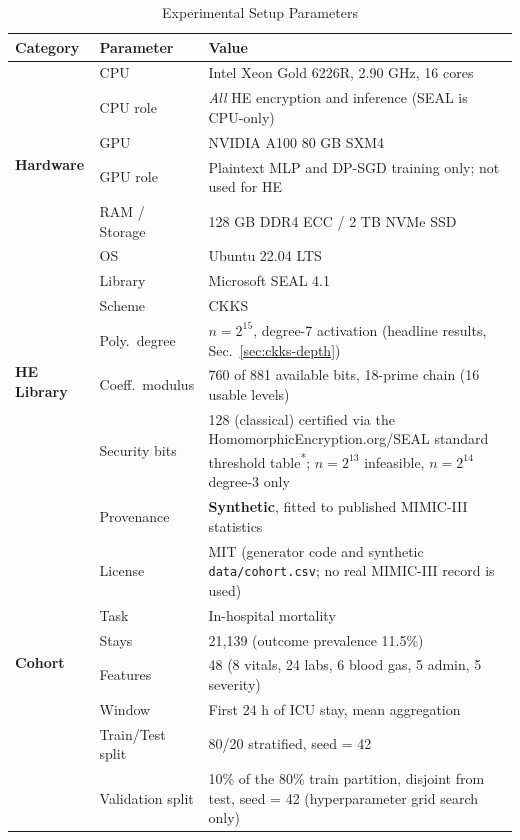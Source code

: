 \documentclass[journal,compsoc]{IEEEtran}
\begin{document}
\begin{table}[!t]
\caption{Experimental Setup Parameters}
\label{tab:setup}
\begin{tabularx}{\textwidth}{l l X}
\toprule
\textbf{Category} & \textbf{Parameter} & \textbf{Value} \\
\midrule
\multirow{6}{*}{\textbf{Hardware}}
  & CPU     & Intel Xeon Gold 6226R, 2.90 GHz, 16 cores \\
  & CPU role & \emph{All} HE encryption and inference (SEAL is CPU-only) \\
  & GPU     & NVIDIA A100 80 GB SXM4 \\
  & GPU role & Plaintext MLP and DP-SGD training only; not used for HE \\
  & RAM / Storage & 128 GB DDR4 ECC / 2 TB NVMe SSD \\
  & OS      & Ubuntu 22.04 LTS \\
\midrule
\multirow{5}{*}{\textbf{HE Library}}
  & Library       & Microsoft SEAL 4.1 \cite{seal2024} \\
  & Scheme        & CKKS \\
  & Poly.\ degree & $n = 2^{15}$, degree-7 activation (headline results, Sec.~\ref{sec:ckks-depth}) \\
  & Coeff.\ modulus & 760 of 881 available bits, 18-prime chain (16 usable levels) \\
  & Security bits & 128 (classical) certified via the HomomorphicEncryption.org/SEAL standard threshold table\textsuperscript{*}; $n=2^{13}$ infeasible, $n=2^{14}$ degree-3 only \\
\midrule
\multirow{8}{*}{\textbf{Cohort}}
  & Provenance      & \textbf{Synthetic}, fitted to published MIMIC-III statistics \cite{johnson2016mimic} \\
  & License         & MIT (generator code and synthetic \texttt{data/cohort.csv}; no real MIMIC-III record is used) \\
  & Task            & In-hospital mortality \cite{harutyunyan2019multitask} \\
  & Stays           & 21,139 (outcome prevalence 11.5\%) \\
  & Features        & 48 (8 vitals, 24 labs, 6 blood gas, 5 admin, 5 severity) \\
  & Window          & First 24 h of ICU stay, mean aggregation \\
  & Train/Test split & 80/20 stratified, seed = 42 \\
  & Validation split & 10\% of the 80\% train partition, disjoint from test, seed = 42 (hyperparameter grid search only) \\

\end{tabularx}
\end{table}
\end{document}

